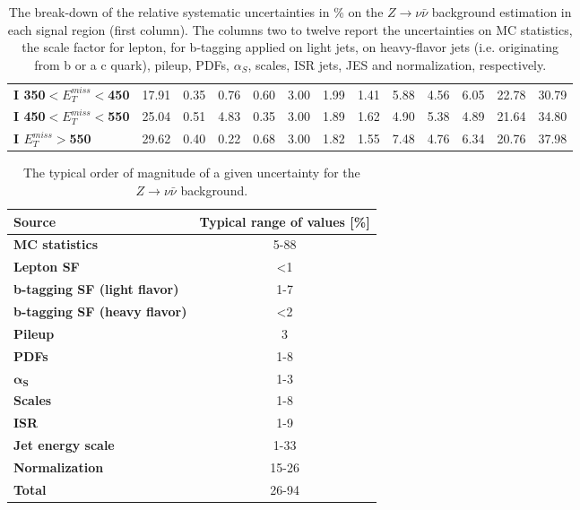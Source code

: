 \begin{table}[h]
\begin{center}
{\begin{tabular}{|l|ccccccccccc|c|}
\textbf{ I 350$<E_T^{miss}<$450}         & 17.91         & 0.35          & 0.76          & 0.60          & 3.00          & 1.99          & 1.41          & 5.88          & 4.56          & 6.05          & 22.78         & 30.79         \\
\textbf{ I 450$<E_T^{miss}<$550}         & 25.04         & 0.51          & 4.83          & 0.35          & 3.00          & 1.89          & 1.62          & 4.90          & 5.38          & 4.89          & 21.64         & 34.80         \\
\textbf{ I $E_T^{miss}>$550}    & 29.62         & 0.40          & 0.22          & 0.68          & 3.00          & 1.82          & 1.55          & 7.48          & 4.76          & 6.34          & 20.76         & 37.98         \\
\hline
\end{tabular}}
\caption[Table caption text]{The break-down of the relative systematic uncertainties in \% on the $Z \to \nu \bar{\nu}$ background estimation in each signal region (first column). The columns two to twelve report the uncertainties on MC statistics, the scale factor for lepton, for b-tagging applied on light jets, on heavy-flavor jets (i.e. originating from  b or a c quark), pileup, PDFs, $\alpha_{S}$, scales, ISR jets, JES and normalization, respectively.   }
\label{tab:SysZnunu}
\end{center}
\end{table}

\begin{table}[h]
\begin{center}
\begin{tabular}{|l|c|}
\hline
\textbf{Source}       & \textbf{Typical range of values} [\%]                       \\
\hline
\textbf{MC statistics}      &  5-88   \\
\hline
\textbf{Lepton SF}              &  <1  \\
\textbf{b-tagging SF (light flavor)}      &  1-7  \\
\textbf{b-tagging SF (heavy flavor)}      &  <2  \\
\textbf{Pileup}                          &  3  \\
\textbf{PDFs}                 &  1-8  \\
\textbf{$\mathbf{\alpha_{S}}$}                 &  1-3  \\
\textbf{Scales}                 &  1-8  \\
\textbf{ISR}                 &  1-9  \\
\textbf{Jet energy scale}                 &  1-33  \\
\textbf{Normalization}                 &  15-26  \\
\hline
\textbf{Total}                 &  26-94  \\
\hline
\end{tabular}
\caption[Table caption text]{The typical order of magnitude of a given uncertainty for the $Z \to \nu \bar{\nu}$ background.  }
\label{tab:SysZnunuSum}
\end{center}
\end{table}

